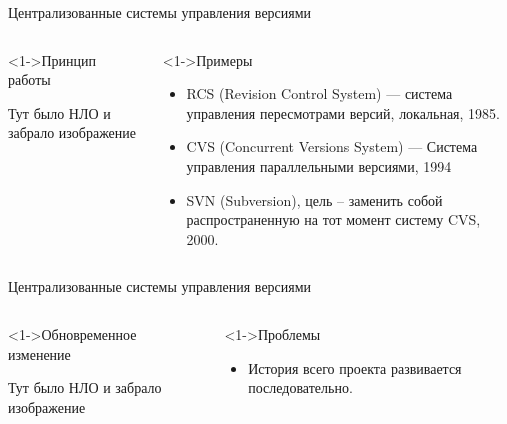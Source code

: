 \documentclass[pdf,9pt,aspectratio=169]{beamer}
\begin{document}
\begin{frame}{Централизованные системы управления версиями}
  \begin{columns}[T]
    \begin{column}[]{0.45\textwidth}  
      \begin{exampleblock}<1->{Принцип работы}
        \begin{center}
           \Huge Тут было НЛО и забрало изображение
        \end{center}
      \end{exampleblock}
    \end{column}
    \begin{column}[]{0.45\textwidth}  
      \begin{block}<1->{Примеры}
        \begin{itemize}
          \item RCS (Revision Control System) --- система управления пересмотрами версий, локальная, 1985.
          \item CVS (Concurrent Versions System) --- Система управления параллельными версиями, 1994
          \item SVN (Subversion), цель -- заменить собой распространенную на тот момент систему CVS, 2000.
        \end{itemize}
      \end{block}
    \end{column}
  \end{columns}
  \vfill
\end{frame}

\begin{frame}{Централизованные системы управления версиями}
  \begin{columns}[T]
    \begin{column}[]{0.45\textwidth}  
      \begin{exampleblock}<1->{Обновременное изменение}
        \begin{center}
           \Huge Тут было НЛО и забрало изображение
        \end{center}
      \end{exampleblock}
    \end{column}
    \begin{column}[]{0.45\textwidth}  
      \begin{alertblock}<1->{Проблемы}
        \begin{itemize}
          \item История всего проекта развивается последовательно.
        \end{itemize}
      \end{alertblock}
    \end{column}
  \end{columns}
  \vfill
\end{frame}
\end{document}
